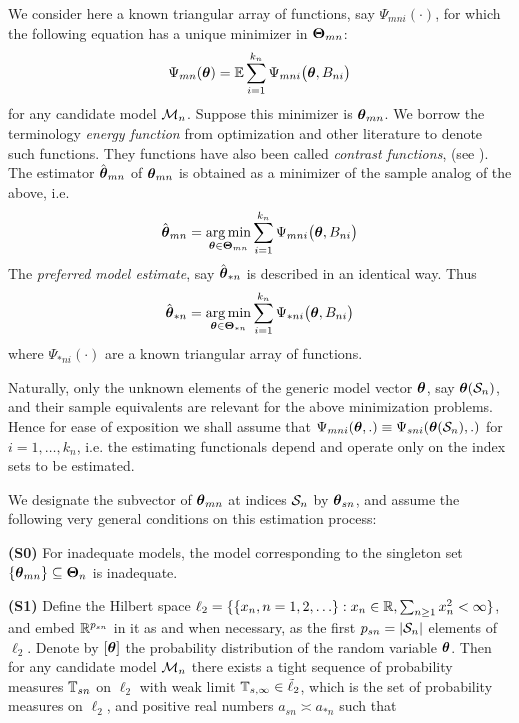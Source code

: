 We consider here a known triangular array of functions, say $\Psi_{m n i} (\cdot)$, for which the following equation has a unique minimizer in ${\boldsymbol{\Theta}}_{mn}$:
%
\begin{align}
\Psi_{m n} ({\boldsymbol{\theta}}) = {\mathbb{E}} \sum_{i = 1}^{k_{n}} \Psi_{m n i}  \bigl( {\boldsymbol{\theta}}, B_{ni} \bigr)
\label{eq:Psisn}
\end{align}
%
for any candidate model ${\cal{M}}_n$. Suppose this minimizer is ${\boldsymbol{\theta}}_{m n}$. We borrow the terminology {\textit{energy function}} from optimization and other literature to denote such functions. They functions have also been called \textit{contrast functions}, (see \cite{Pfanzagl69, MichelPfanzagl71, BoseChatterjee03}). The estimator $\hat{{\boldsymbol{\theta}}}_{m n}$ of ${\boldsymbol{\theta}}_{m n}$ is obtained as a minimizer of the sample analog of the above, i.e.
%
\begin{align}
\hat{{\boldsymbol{\theta}}}_{m n} = \operatorname*{arg\,min}_{{\boldsymbol{\theta}} \in {\boldsymbol{\Theta}}_{m n}} \sum_{i = 1}^{k_{n}} \Psi_{m n i}  \bigl( {\boldsymbol{\theta}}, B_{ni} \bigr)
\label{eq:Psisnhat}
\end{align}
%
The {\it preferred model estimate}, say $\hat{{\boldsymbol{\theta}}}_{*n}$ is described in an identical way. Thus
%
\begin{align}
\hat{{\boldsymbol{\theta}}}_{*n} = \operatorname*{arg\,min}_{{\boldsymbol{\theta}} \in {\boldsymbol{\Theta}}_{*n}} \sum_{i = 1}^{k_{n}} \Psi_{*ni}  \bigl( {\boldsymbol{\theta}}, B_{ni} \bigr)
\label{eq:Psistarnhat}
\end{align}
%
where $\Psi_{*ni} (\cdot)$ are a known triangular array of functions.

Naturally, only the unknown elements of the generic model vector ${\boldsymbol{\theta}}$, say ${\boldsymbol{\theta}} ({\cal{S}}_n)$, and their sample equivalents are relevant for the above minimization problems. Hence for ease of exposition we shall assume that $\Psi_{m n i}( {\boldsymbol{\theta}}, . ) \equiv \Psi_{s n i}( {\boldsymbol{\theta}} ({\cal{S}}_n),.)$ for $i = 1, \ldots, k_n$, i.e. the estimating functionals depend and operate only on the index sets to be estimated. 

We designate the subvector of ${\boldsymbol{\theta}}_{m n}$ at indices ${\cal{S}}_n$ by ${\boldsymbol{\theta}}_{s n}$, and assume the following very general conditions on this estimation process:

\vspace{1em}
\noindent\textbf{(S0)} For inadequate models, the model corresponding to the singleton set $\{ {\boldsymbol{\theta}}_{m n} \} \subseteq {\boldsymbol{\Theta}}_n$ is inadequate.

\noindent\textbf{(S1)} Define the Hilbert space 
$\ell_{2} = \{ \{x_{n}, n = 1, 2, \ldots \}: x_{n} \in {\mathbb{R}}, \sum_{n \geq 1} x_{n}^{2} <\infty \}$, and embed ${\mathbb{R}}^{ p_{s n}}$ in it as and when necessary, as the first $p_{s n} = | {\cal{S}}_n |$ elements of $\ell_{2}$. Denote by $[{\boldsymbol{\theta}}]$ the probability distribution of the random variable ${\boldsymbol{\theta}}$. Then for any candidate model ${\cal{M}}_n$ there exists a tight sequence of probability measures ${\mathbb{T}}_{s n}$ on $\ell_2$ with weak limit ${\mathbb{T}}_{s,\infty} \in \tilde \ell_2$, which is the set of probability measures on $\ell_2$, and positive real numbers $a_{s n} \asymp a_{* n}$ such that

